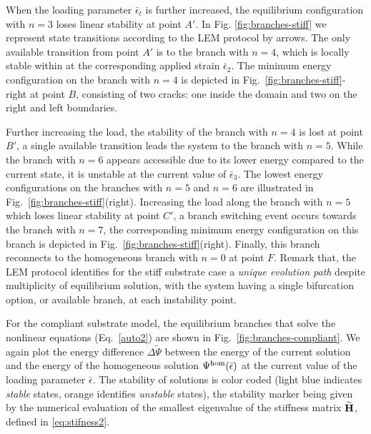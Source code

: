 When the loading parameter $\bar{\epsilon}_t$ is further increased, the equilibrium configuration with $n=3$ loses linear stability at point $A'$. In Fig. \ref{fig:branches-stiff} we represent state transitions according to the LEM protocol by arrows. The only available transition from point $A'$ is to the branch with $n=4$, which is locally stable within at the corresponding applied strain $\bar{\epsilon}_2$. The minimum energy configuration on the branch with $n=4$ is depicted in Fig.~\ref{fig:branches-stiff}-right at point $B$, consisting of two cracks: one inside the domain and two on the right and left boundaries.

Further increasing the load, the stability of the branch with $n=4$ is lost at point $B'$, a single available transition leads the system to the branch with $n=5$. While the branch with $n=6$ appears accessible due to its lower energy compared to the current state, it is unstable at the current value of $\bar\epsilon_3$. The lowest energy configurations on the branches with $n=5$ and $n=6$ are illustrated in Fig.~\ref{fig:branches-stiff}(right). Increasing the load along the branch with $n=5$ which loses linear stability at point $C'$, a branch switching event occurs towards the branch with $n=7$, the corresponding minimum energy configuration on this branch is depicted in Fig.~\ref{fig:branches-stiff}(right). Finally, this branch reconnects to the homogeneous branch with $n=0$ at point $F$. Remark that, the LEM protocol identifies for the stiff substrate case a \emph{unique evolution path} despite  multiplicity of equilibrium solution, with the system having a single bifurcation option, or available branch, at each instability point.

For the compliant substrate model, the equilibrium branches that solve the nonlinear equations (Eq.~\ref{auto2}) are shown in Fig.~\ref{fig:branches-compliant}.
We again plot the energy difference $\Delta \widetilde\Psi$ between the energy of the current solution and the energy of the homogeneous solution $\Psi^\text{hom} (\bar{\epsilon})$ at the current value of the loading parameter $\bar\epsilon$.
The stability of solutions is color coded (light blue indicates \emph{stable} states, orange identifies \emph{unstable} states), the stability marker being given by the numerical evaluation of the smallest eigenvalue of the stiffness matrix $\widetilde{\mathbf{H}}$, defined in \eqref{eq:stifness2}.

